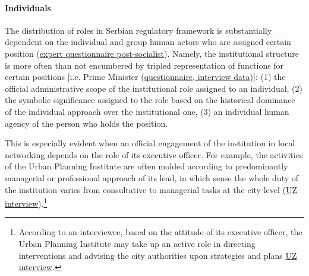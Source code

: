 \documentclass[11pt]{report}
\begin{document}
\paragraph{Individuals}
The distribution of roles in Serbian regulatory framework is substantially dependent on the individual and group human actors who are assigned certain position (\href{}{expert questionnaire post-socialist}). Namely, the institutional structure is more often than not encumbered by tripled representation of functions for certain positions [i.e. Prime Minister (\href{}{questionnaire, interview data})]:
(1) the official administrative scope of the institutional role assigned to an individual,
(2) the symbolic significance assigned to the role based on the historical dominance of the individual approach over the institutional one,
(3) an individual human agency of the person who holds the position.

This is especially evident when an official engagement of the institution in local networking depends on the role of its executive officer.
For example, the activities of the Urban Planning Institute are often molded according to predominantly managerial or professional approach of its lead, in which sense the whole duty of the institution varies from consultative to managerial tasks at the city level (\href{}{UZ interview}).\footnote{
According to an interviewee, based on the attitude of its executive officer, the Urban Planning Institute may take up an active role in directing interventions and advising the city authorities upon strategies and plans \href{}{UZ interview}.}
\end{document}
